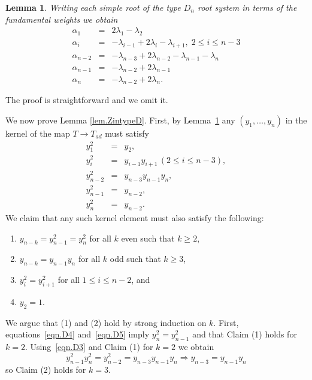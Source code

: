 \documentclass[reqno,11pt]{amsart}
\newtheorem{Lem}[Thm]{Lemma}
\theoremstyle{remark}
\theoremstyle{remark}
\theoremstyle{definition}
\theoremstyle{definition}
\theoremstyle{definition}
\numberwithin{equation}{section}
\begin{document}
\begin{Lem}\label{lem.Dformula} Writing each simple root of the type $D_n$ root system in terms of the fundamental weights we obtain
\begin{eqnarray*}
\alpha_1 &=& 2\lambda_1-\lambda_2\\
\alpha_i &=& -\lambda_{i-1}+2\lambda_i -\lambda_{i+1},\; 2\leq i \leq n-3\\
\alpha_{n-2} &=& -\lambda_{n-3}+2\lambda_{n-2}-\lambda_{n-1}-\lambda_n\\
\alpha_{n-1} &=& -\lambda_{n-2}+2\lambda_{n-1}\\
\alpha_n &=& -\lambda_{n-2}+2\lambda_{n}.
\end{eqnarray*}
\end{Lem}
The proof is straightforward and we omit it.

We now prove Lemma \ref{lem.ZintypeD}. First, by Lemma~\ref{lem.Dformula} any $(y_1, \ldots, y_n)$ in the kernel of the map $T \to T_{ad}$ must satisfy
\begin{eqnarray}
\label{eqn.D1}y_1^2 &=&y_2,\\ 
\label{eqn.D2}y_i^2&=&y_{i-1}y_{i+1}\, (2\leq i \leq n-3),\\ 
\label{eqn.D3}y_{n-2}^2&=&y_{n-3}y_{n-1}y_n,\\ 
\label{eqn.D4}y_{n-1}^2 &=& y_{n-2},\\ 
\label{eqn.D5}y_n^2&=& y_{n-2}.
\end{eqnarray}
We claim that any such kernel element must also satisfy the following:
\begin{enumerate}
\item $y_{n-k}=y_{n-1}^2 = y_{n}^2$ for all $k$ even such that $k\geq 2$,
\item $y_{n-k}= y_{n-1}y_{n}$ for all $k$ odd such that $k\geq 3$, 
\item $y_i^2=y_{i+1}^2$ for all $1\leq i \leq n-2$, and
\item $y_2=1$.
\end{enumerate}
We argue that (1) and (2) hold by strong induction on $k$. First, equations~\eqref{eqn.D4} and~\eqref{eqn.D5} imply $y_n^2=y_{n-1}^2$ and that Claim (1) holds for $k=2$.  Using~\eqref{eqn.D3} and Claim (1) for $k=2$ we obtain 
\[
y_{n-1}^2y_{n}^2 = y_{n-2}^2 = y_{n-3}y_{n-1}y_n \Rightarrow y_{n-3} = y_{n-1}y_n
\]
so Claim (2) holds for $k=3$. 
\end{document}
